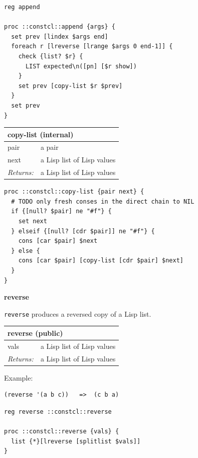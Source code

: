 \documentclass[twoside,9pt]{report}
\begin{document}
\noindent\makebox[\linewidth]{\rule{\linewidth}{0.4pt}}
\begin{lstlisting}
reg append
 
proc ::constcl::append {args} {
  set prev [lindex $args end]
  foreach r [lreverse [lrange $args 0 end-1]] {
    check {list? $r} {
      LIST expected\n([pn] [$r show])
    }
    set prev [copy-list $r $prev]
  }
  set prev
}
\end{lstlisting}
\noindent\makebox[\linewidth]{\rule{\linewidth}{0.4pt}}
\begin{tabular}{ |l l| }
\hline
\multicolumn{2}{|l|}{copy-list (internal)} \\
\hline
pair & a pair \\
next & a Lisp list of Lisp values \\
\textit{Returns:} & a Lisp list of Lisp values \\
\hline
\end{tabular}

\noindent\makebox[\linewidth]{\rule{\linewidth}{0.4pt}}
\begin{lstlisting}
proc ::constcl::copy-list {pair next} {
  # TODO only fresh conses in the direct chain to NIL
  if {[null? $pair] ne "#f"} {
    set next
  } elseif {[null? [cdr $pair]] ne "#f"} {
    cons [car $pair] $next
  } else {
    cons [car $pair] [copy-list [cdr $pair] $next]
  }
}
\end{lstlisting}
\noindent\makebox[\linewidth]{\rule{\linewidth}{0.4pt}}

\textbf{reverse}


\texttt{reverse} produces a reversed copy of a Lisp list.

\begin{tabular}{ |l l| }
\hline
\multicolumn{2}{|l|}{reverse (public)} \\
\hline
vals & a Lisp list of Lisp values \\
\textit{Returns:} & a Lisp list of Lisp values \\
\hline
\end{tabular}


Example:

\noindent\makebox[\linewidth]{\rule{\linewidth}{0.4pt}}
\begin{lstlisting}
(reverse '(a b c))   =>  (c b a)
\end{lstlisting}
\noindent\makebox[\linewidth]{\rule{\linewidth}{0.4pt}}
\noindent\makebox[\linewidth]{\rule{\linewidth}{0.4pt}}
\begin{lstlisting}
reg reverse ::constcl::reverse
 
proc ::constcl::reverse {vals} {
  list {*}[lreverse [splitlist $vals]]
}
\end{lstlisting}
\noindent\makebox[\linewidth]{\rule{\linewidth}{0.4pt}}
\end{document}
